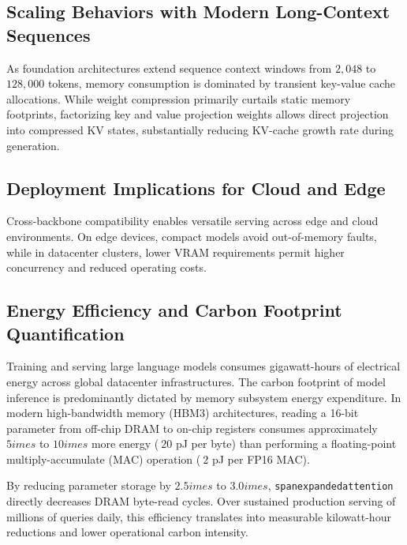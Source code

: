 \subsection{Scaling Behaviors with Modern Long-Context Sequences}
As foundation architectures extend sequence context windows from $2{,}048$ to $128{,}000$ tokens, memory consumption is dominated by transient key-value cache allocations. While weight compression primarily curtails static memory footprints, factorizing key and value projection weights allows direct projection into compressed KV states, substantially reducing KV-cache growth rate during generation.

\subsection{Deployment Implications for Cloud and Edge}
Cross-backbone compatibility enables versatile serving across edge and cloud environments. On edge devices, compact models avoid out-of-memory faults, while in datacenter clusters, lower VRAM requirements permit higher concurrency and reduced operating costs.

\subsection{Energy Efficiency and Carbon Footprint Quantification}
Training and serving large language models consumes gigawatt-hours of electrical energy across global datacenter infrastructures. The carbon footprint of model inference is predominantly dictated by memory subsystem energy expenditure. In modern high-bandwidth memory (HBM3) architectures, reading a 16-bit parameter from off-chip DRAM to on-chip registers consumes approximately $5	imes$ to $10	imes$ more energy ($~20$ pJ per byte) than performing a floating-point multiply-accumulate (MAC) operation ($~2$ pJ per FP16 MAC).

By reducing parameter storage by $2.5	imes$ to $3.0	imes$, \texttt{spanexpandedattention} directly decreases DRAM byte-read cycles. Over sustained production serving of millions of queries daily, this efficiency translates into measurable kilowatt-hour reductions and lower operational carbon intensity.

